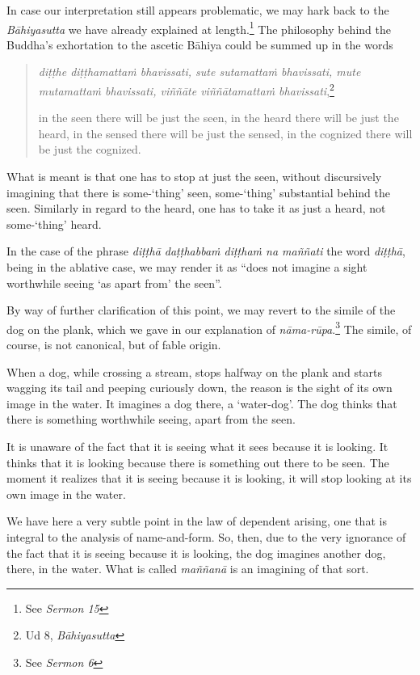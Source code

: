 In case our interpretation still appears problematic, we may hark back to the \emph{Bāhiyasutta} we have already explained at length.\footnote{See \emph{Sermon 15}} The philosophy behind the Buddha's exhortation to the ascetic Bāhiya could be summed up in the words

\begin{quote}
\emph{diṭṭhe diṭṭhamattaṁ bhavissati, sute sutamattaṁ bhavissati, mute mutamattaṁ bhavissati, viññāte viññātamattaṁ bhavissati},\footnote{Ud 8, \emph{Bāhiyasutta}}

in the seen there will be just the seen, in the heard there will be just the heard, in the sensed there will be just the sensed, in the cognized there will be just the cognized.
\end{quote}

What is meant is that one has to stop at just the seen, without discursively imagining that there is some-`thing' seen, some-`thing' substantial behind the seen. Similarly in regard to the heard, one has to take it as just a heard, not some-`thing' heard.

In the case of the phrase \emph{diṭṭhā daṭṭhabbaṁ diṭṭhaṁ na maññati} the word \emph{diṭṭhā}, being in the ablative case, we may render it as ``does not imagine a sight worthwhile seeing `as apart from' the seen''.

By way of further clarification of this point, we may revert to the simile of the dog on the plank, which we gave in our explanation of \emph{nāma-rūpa}.\footnote{See \emph{Sermon 6}} The simile, of course, is not canonical, but of fable origin.

When a dog, while crossing a stream, stops halfway on the plank and starts wagging its tail and peeping curiously down, the reason is the sight of its own image in the water. It imagines a dog there, a `water-dog'. The dog thinks that there is something worthwhile seeing, apart from the seen.

It is unaware of the fact that it is seeing what it sees because it is looking. It thinks that it is looking because there is something out there to be seen. The moment it realizes that it is seeing because it is looking, it will stop looking at its own image in the water.

We have here a very subtle point in the law of dependent arising, one that is integral to the analysis of name-and-form. So, then, due to the very ignorance of the fact that it is seeing because it is looking, the dog imagines another dog, there, in the water. What is called \emph{maññanā} is an imagining of that sort.

